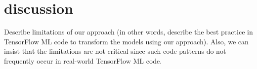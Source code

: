 \section{discussion}\label{sec:discussion}
Describe limitations of our approach (in other words, describe the best
practice in TensorFlow ML code to transform the models using our approach).
Also, we can insist that the limitations are not critical since such code
patterns do not frequently occur in real-world TensorFlow ML code.
